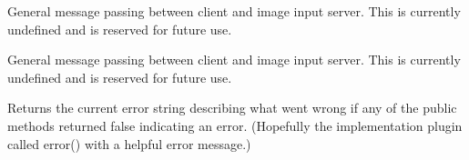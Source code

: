 General message passing between client and image input server.
This is currently undefined and is reserved for future use.
\apiend

General message passing between client and image input server.
This is currently undefined and is reserved for future use.
\apiend

Returns the current error string describing what went wrong if
any of the public methods returned {\kw false} indicating an error.
(Hopefully the implementation plugin called {\kw error()} with a
helpful error message.)
\apiend




\chapwidthend
